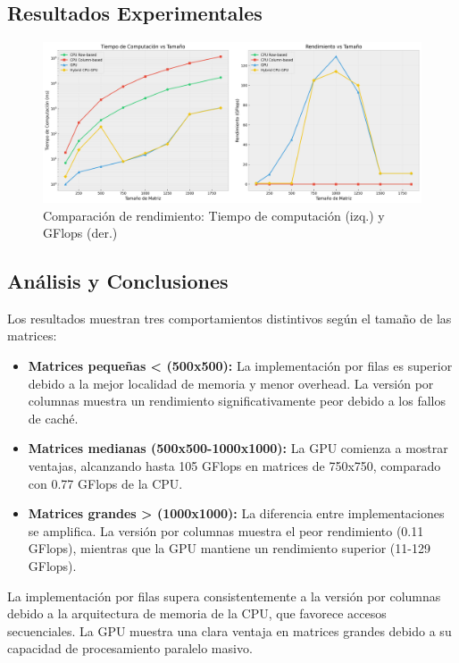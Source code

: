 \documentclass[11pt]{article}
\begin{document}
\subsection{Resultados Experimentales}
\begin{figure}[h]
    \centering
    \includegraphics[width=\textwidth]{grafica.png}
    \caption{Comparación de rendimiento: Tiempo de computación (izq.) y GFlops (der.)}
    \label{fig:performance}
\end{figure}

\subsection{Análisis y Conclusiones}
Los resultados muestran tres comportamientos distintivos según el tamaño de las matrices:

\begin{itemize}
    \item \textbf{Matrices pequeñas < (500x500):} La implementación por filas es superior debido a la mejor localidad de memoria y menor overhead. La versión por columnas muestra un rendimiento significativamente peor debido a los fallos de caché.
    
    \item \textbf{Matrices medianas (500x500-1000x1000):} La GPU comienza a mostrar ventajas, alcanzando hasta 105 GFlops en matrices de 750x750, comparado con 0.77 GFlops de la CPU.
    
    \item \textbf{Matrices grandes > (1000x1000):} La diferencia entre implementaciones se amplifica. La versión por columnas muestra el peor rendimiento (0.11 GFlops), mientras que la GPU mantiene un rendimiento superior (11-129 GFlops).
\end{itemize}

La implementación por filas supera consistentemente a la versión por columnas debido a la arquitectura de memoria de la CPU, que favorece accesos secuenciales. La GPU muestra una clara ventaja en matrices grandes debido a su capacidad de procesamiento paralelo masivo.
\end{document}
